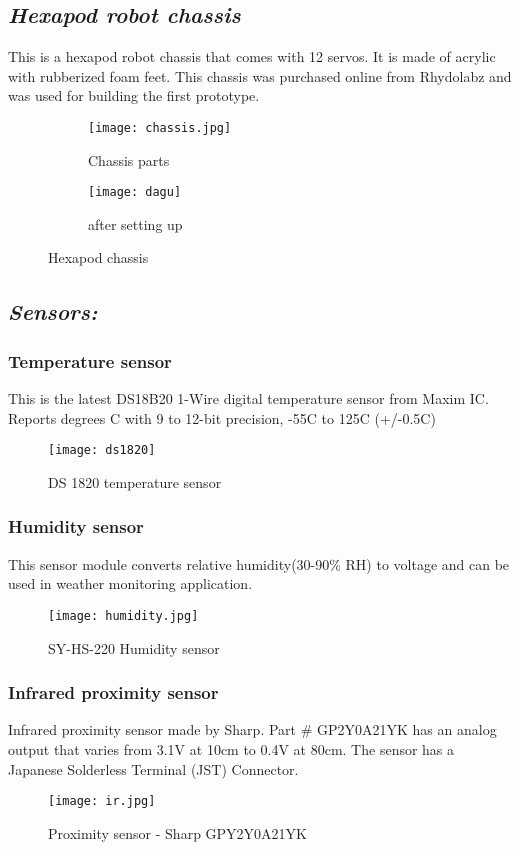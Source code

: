 \documentclass{report}
\begin{document}
\subsection*{\emph{Hexapod robot chassis}}
This is a hexapod robot chassis that comes with 12 servos. It is made of acrylic with rubberized foam feet. This chassis was purchased online from Rhydolabz and was used for building the first prototype.
\begin{figure}[h!]
\begin{subfigure}{0.5\textwidth}
	\centering
	\texttt{[image: chassis.jpg]}
\caption{Chassis parts}
\end{subfigure}%
%
\begin{subfigure}{0.5\textwidth}
	\centering
	\texttt{[image: dagu]}
	\caption{after setting up}
\end{subfigure}
\caption{Hexapod chassis}
\label{fig25}
\end{figure}          
\subsection*{\emph{Sensors:}}
\subsubsection{Temperature sensor}
This is the latest DS18B20 1-Wire digital temperature sensor from Maxim IC. Reports degrees C with 9 to 12-bit precision, -55C to 125C (+/-0.5C)
\begin{figure}[h!]
\centering
\texttt{[image: ds1820]}
\caption{DS 1820 temperature sensor}
\label{fig26}
\end{figure}
\FloatBarrier

\subsubsection{Humidity sensor}
 This sensor module converts relative humidity(30-90\% RH) to voltage and can be used in weather monitoring application.
\begin{figure}[h!]
\centering
\texttt{[image: humidity.jpg]}
\caption{SY-HS-220 Humidity sensor}
\label{fig27}
\end{figure}
\subsubsection{Infrared proximity sensor}
Infrared proximity sensor made by Sharp. Part \#  GP2Y0A21YK has an analog output that varies from 3.1V at 10cm to 0.4V at 80cm. The sensor has a Japanese Solderless Terminal (JST) Connector. 
\begin{figure}[h!]
\centering
\texttt{[image: ir.jpg]}
\caption{Proximity sensor - Sharp GPY2Y0A21YK}
\label{fig28}
\end{figure}
\end{document}
